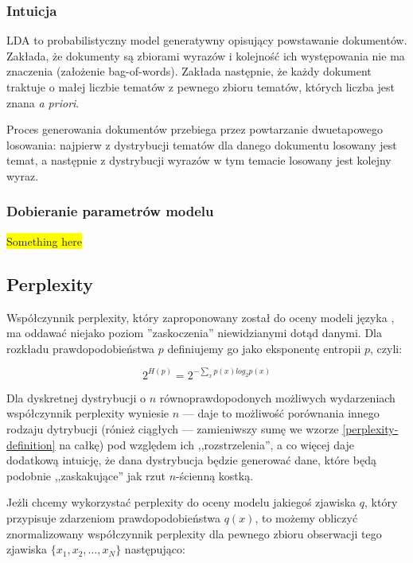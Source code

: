 \documentclass[11pt,a4paper]{article}
\newcommand{\todo}[1]{\colorbox{yellow}{#1}}
\begin{document}
\subsubsection{Intuicja}

LDA to probabilistyczny model generatywny opisujący powstawanie dokumentów.
Zakłada, że dokumenty są zbiorami wyrazów i kolejność ich występowania nie ma
znaczenia (założenie bag-of-words). Zakłada następnie, że każdy dokument
traktuje o małej liczbie tematów z pewnego zbioru tematów, których liczba jest
znana \emph{a priori}.

Proces generowania dokumentów przebiega przez powtarzanie dwuetapowego
losowania: najpierw z dystrybucji tematów dla danego dokumentu losowany jest
temat, a następnie z dystrybucji wyrazów w tym temacie losowany jest kolejny
wyraz.

\subsubsection{Dobieranie parametrów modelu}

\todo{Something here}

\subsection{Perplexity}

Współczynnik perplexity, który zaproponowany został do oceny modeli języka
\cite{bahl-perplexity}, ma oddawać niejako poziom ''zaskoczenia'' niewidzianymi
dotąd danymi. Dla rozkładu prawdopodobieństwa $p$ definiujemy go jako
eksponentę entropii $p$, czyli:

\begin{equation}
  \label{perplexity-definition}
  2^{H(p)} = 2^{-\sum_x p(x)log_2 p(x)}
\end{equation}

Dla dyskretnej dystrybucji o $n$ równoprawdopodonych możliwych wydarzeniach
współczynnik perplexity wyniesie $n$ --- daje to możliwość porównania innego
rodzaju dytrybucji (rónież ciągłych --- zamieniwszy sumę we wzorze
\ref{perplexity-definition} na całkę) pod względem ich ,,rozstrzelenia'', a co
więcej daje dodatkową intuicję, że dana dystrybucja będzie generować dane,
które będą podobnie ,,zaskakujące'' jak rzut $n$-ścienną kostką.

Jeżli chcemy wykorzystać perplexity do oceny modelu jakiegoś zjawiska $q$,
który przypisuje zdarzeniom prawdopodobieństwa $q(x)$, to możemy obliczyć
znormalizowany współczynnik perplexity dla pewnego zbioru obserwacji tego zjawiska
$\{x_1, x_2, \ldots, x_N\}$ następująco:
\end{document}
